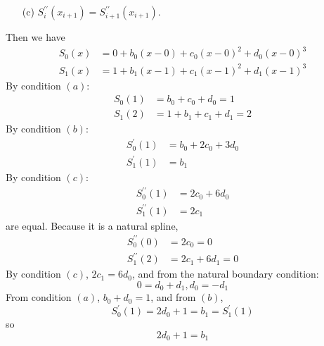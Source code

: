 \documentclass{article}
\begin{document}
\begin{answer}
\begin{itemize}
                \item [(c)] $S^{\prime\prime}_{i}(x_{i + 1}) = S^{\prime\prime}_{i + 1}(x_{i + 1})$.  
            \end{itemize}
        Then we have 
            \begin{align*}
                S_{0}(x) &= 0 + b_{0}(x - 0) + c_{0}(x - 0)^{2} + d_{0}(x - 0)^{3} \\
                S_{1}(x) &= 1 + b_{1}(x - 1) + c_{1}(x - 1)^{2} + d_{1}(x - 1)^{3}   
            \end{align*}
        By condition $(a)$:
            \begin{align*}
                S_{0}(1) &= b_{0} + c_{0} + d_{0} = 1 \\
                S_{1}(2) &= 1 + b_{1} + c_{1} + d_{1} = 2
            \end{align*}
        By condition $(b)$:
            \begin{align*}
                S^{\prime}_{0}(1) &= b_{0} + 2c_{0} + 3d_{0} \\
                S^{\prime}_{1}(1) &= b_{1}                 
            \end{align*}
        By condition $(c)$:
            \begin{align*}
                S^{\prime\prime}_{0}(1) &= 2c_{0} + 6d_{0} \\
                S^{\prime\prime}_{1}(1) &= 2c_{1}            
            \end{align*}
        are equal. Because it is a natural spline,
            \begin{align*}
                S^{\prime\prime}_{0}(0) &= 2c_{0} = 0          \\
                S^{\prime\prime}_{1}(2) &= 2c_{1} + 6d_{1} = 0   
            \end{align*}
        By condition $(c)$, $2c_{1} = 6d_{0}$, and from the natural boundary condition:
            \begin{equation*}
                0 = d_{0} + d_{1}, d_{0} = -d_{1}
            \end{equation*}
        From condition $(a)$, $b_{0} + d_{0} = 1$, and from $(b)$, 
            \begin{equation*}
                S^{\prime}_{0}(1) = 2d_{0} + 1 = b_{1} = S^{\prime}_{1}(1)
            \end{equation*}
        so
            \begin{equation*}
                2d_{0} + 1 = b_{1}
            \end{equation*}

\end{answer}
\end{document}
